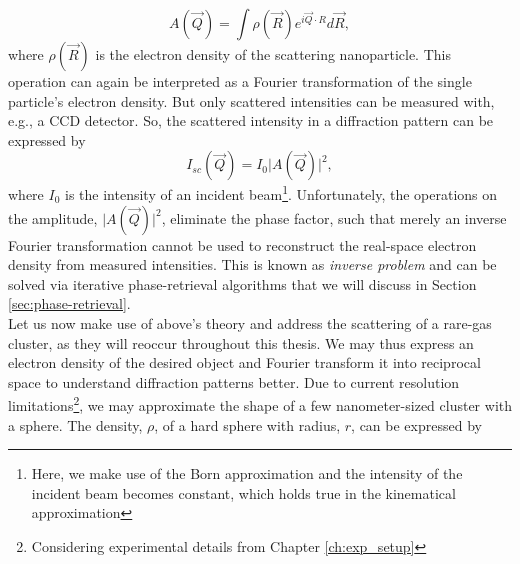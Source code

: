 \begin{equation}
A(\vec{Q})=\int \rho\left(\vec{R}\right) e^{i \vec{Q}\cdot R}d\vec{R},
\label{eq:scattered-amplitude}
\end{equation}
where $\rho\left(\vec{R}\right)$ is the electron density of the scattering nanoparticle. This operation can again be interpreted as a Fourier transformation of the single particle’s electron density. But only scattered intensities can be measured with, e.g., a CCD detector. So, the scattered intensity in a diffraction pattern can be expressed by
\begin{equation}
I_{sc}\left(\vec{Q}\right)=I_{0}\lvert A(\vec{Q})\rvert^{2},
\label{eq:scattered-intensity}
\end{equation}
where $I_{0}$ is the intensity of an incident beam\footnote{Here, we make use of the Born approximation and the intensity of the incident beam becomes constant, which holds true in the kinematical approximation}. Unfortunately, the operations on the amplitude, $\lvert A(\vec{Q})\rvert^{2}$, eliminate the phase factor, such that merely an inverse Fourier transformation cannot be used to reconstruct the real-space electron density from measured intensities. This is known as \textit{inverse problem} and can be solved via iterative phase-retrieval algorithms that we will discuss in Section \ref{sec:phase-retrieval}.\\[1\baselineskip]
%
Let us now make use of above's theory and address the scattering of a rare-gas cluster, as they will reoccur throughout this thesis. We may thus express an electron density of the desired object and Fourier transform it into reciprocal space to understand diffraction patterns better. Due to current resolution limitations\footnote{Considering experimental details from Chapter \ref{ch:exp_setup}}, we may approximate the shape of a few nanometer-sized cluster with a sphere. The density, $\rho$, of a hard sphere with radius, $r$, can be expressed by 
